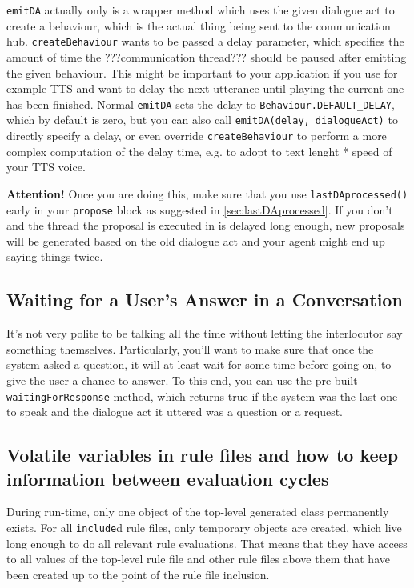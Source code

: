 \texttt{emitDA} actually only is a wrapper method which uses the given
dialogue act to create a behaviour, which is the actual thing being
sent to the communication hub. \texttt{createBehaviour} wants to be
passed a delay parameter, which specifies the amount of time the
???communication thread???    should be paused after emitting the given
behaviour. This might be important to your application if you use for
example TTS and want to delay the next utterance until playing the
current one has been finished.  Normal \texttt{emitDA} sets the delay
to \texttt{Behaviour.DEFAULT\_DELAY}, which by default is zero, but
you can also call \texttt{emitDA(delay, dialogueAct)} to directly
specify a delay, or even override \texttt{createBehaviour} to perform
a more complex computation of the delay time, e.g. to adopt to text
lenght * speed of your TTS voice.

\textbf{Attention!} Once you are doing this, make sure that you use
\texttt{lastDAprocessed()} early in your \texttt{propose} block as
suggested in \ref{sec:lastDAprocessed}. If you don't and the thread
the proposal is executed in is delayed long enough, new proposals will
be generated based on the old dialogue act and your agent might end up
saying things twice.

\subsection{Waiting for a User's Answer in a Conversation}

It's not very polite to be talking all the time without letting the
interlocutor say something themselves. Particularly, you'll want to
make sure that once the system asked a question, it will at least wait
for some time before going on, to give the user a chance to answer. To
this end, you can use the pre-built \texttt{waitingForResponse}
method, which returns true if the system was the last one to speak and
the dialogue act it uttered was a question or a request.

\subsection{Volatile variables in rule files and how to keep information between evaluation cycles} \label{sec:volatile}

During run-time, only one object of the top-level generated class
permanently exists. For all \texttt{include}d rule files, only
temporary objects are created, which live long enough to do all
relevant rule evaluations. That means that they have access to all
values of the top-level rule file and other rule files above them that
have been created up to the point of the rule file inclusion.

